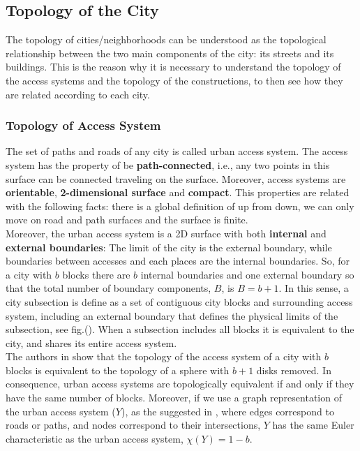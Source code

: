 \documentclass[10pt]{article}
\begin{document}
\subsection{Topology of the City}
The topology of cities/neighborhoods can be understood as the topological relationship between the two main components of the city: its streets and its buildings. This is the reason why it is necessary to understand the topology of the access systems and the topology of the constructions, to then see how they are related according to each city.

\subsubsection{Topology of Access System}
The set of paths and roads of any city is called urban access system. The access system has the property of be \textbf{path-connected}, i.e., any two points in this surface can be connected traveling on the surface. Moreover, access systems are \textbf{orientable}, \textbf{2-dimensional surface} and \textbf{compact}. This properties are related with the following facts: there is a global definition of up from down, we can only move on road and path surfaces and the surface is finite.\\

Moreover, the urban access system is a 2D surface with both \textbf{internal} and \textbf{external boundaries}: The limit of the city is the external boundary, while boundaries between accesses and each places are the internal boundaries. So, for a city with $b$ blocks there are $b$ internal boundaries and one external boundary so that the total number of boundary components, $B$, is $B = b+1$. In this sense, a city subsection is define as a set of contiguous city blocks and surrounding access system, including an external boundary that defines the physical limits of the subsection, see fig.(). When a subsection includes all blocks it is equivalent to the city, and shares its entire access system.\\


The authors in \cite{bre} show that the topology of  the access system of a city with $b$ blocks is equivalent to the topology of a sphere with $b+1$ disks removed. In consequence, urban access systems are topologically equivalent if and only if they have the same number of blocks. Moreover, if we use a graph representation of the urban access system ($Y$), as the suggested in \cite{por}, where edges correspond to roads or paths, and nodes correspond to their intersections, $Y$ has the same Euler characteristic as the urban access system, $\chi(Y) = 1 - b$.\\
\end{document}
